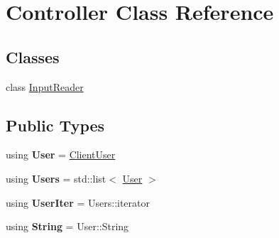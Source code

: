 \hypertarget{classController}{}\section{Controller Class Reference}
\label{classController}
\subsection*{Classes}
\begin{DoxyCompactItemize}
\item 
class \hyperlink{classController_1_1InputReader}{Input\+Reader}
\end{DoxyCompactItemize}
\subsection*{Public Types}
\begin{DoxyCompactItemize}
\item 
using {\bfseries User} = \hyperlink{classClientUser}{Client\+User}\hypertarget{classController_ae8e4814b1b057df2b338500d286a6dd3}{}\label{classController_ae8e4814b1b057df2b338500d286a6dd3}

\item 
using {\bfseries Users} = std\+::list$<$ \hyperlink{classClientUser}{User} $>$\hypertarget{classController_ac0c64a258282568b1fe458447b58cdec}{}\label{classController_ac0c64a258282568b1fe458447b58cdec}

\item 
using {\bfseries User\+Iter} = Users\+::iterator\hypertarget{classController_ac9e8c85fbff11efe305273c65e51cb0f}{}\label{classController_ac9e8c85fbff11efe305273c65e51cb0f}

\item 
using {\bfseries String} = User\+::\+String\hypertarget{classController_a544a3f0a0e5bfb251cfdd457b62374f0}{}\label{classController_a544a3f0a0e5bfb251cfdd457b62374f0}

\end{DoxyCompactItemize}
